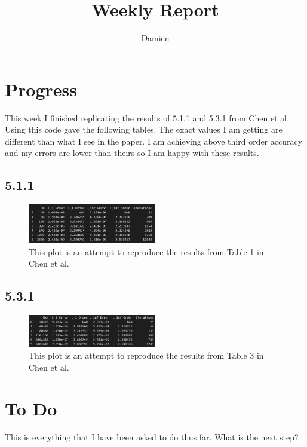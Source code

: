 \documentclass{article}
\title{Weekly Report}
\author{Damien}
\begin{document}
\maketitle
\section{Progress}
This week I finished replicating the results of 5.1.1 and 5.3.1 from Chen et al. Using this code gave the following tables. The exact values I am getting are different than what I see in the paper. I am achieving above third order accuracy and my errors are lower than theirs so I am happy with these results.
\subsection*{5.1.1}
\begin{figure}[h]
    \centering
    \includegraphics[width=0.5\textwidth]{imgs/5_1_1_table.png}
    \caption{This plot is an attempt to reproduce the results from Table 1 in Chen et al.}
\end{figure}
\subsection*{5.3.1}
\begin{figure}[h]
    \centering
    \includegraphics[width=0.5\textwidth]{imgs/5_3_1_table.png}
    \caption{This plot is an attempt to reproduce the results from Table 3 in Chen et al.}
\end{figure}
\section{To Do}
This is everything that I have been asked to do thus far. What is the next step?
\end{document}
